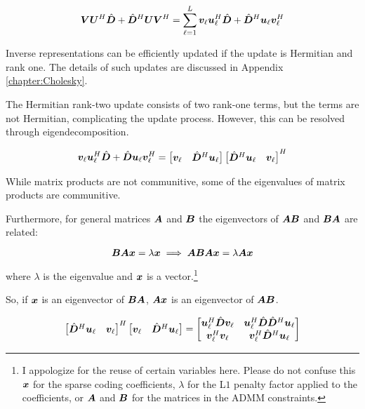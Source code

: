 \begin{equation}
\bm{V}\bm{U}^H\hat{\bm{D}} + \hat{\bm{D}}^H\bm{U}\bm{V}^H = \sum_{\ell = 1}^{L} \bm{v}_{\ell}\bm{u}_{\ell}^H\hat{\bm{D}} + \hat{\bm{D}}^H\bm{u}_{\ell}\bm{v}_{\ell}^H
\end{equation}


Inverse representations can be efficiently updated if the update is Hermitian and rank one. The details of such updates are discussed in Appendix \ref{chapter:Cholesky}.

The Hermitian rank-two update consists of two rank-one terms, but the terms are not Hermitian, complicating the update process. However, this can be resolved through eigendecomposition.  

\begin{equation}
\bm{v}_{\ell}\bm{u}_{\ell}^H \hat{\bm{D}} + \hat{\bm{D}}\bm{u}_{\ell}\bm{v}_{\ell}^H = \begin{bmatrix}
\bm{v}_{\ell} & \hat{\bm{D}}^H\bm{u}_{\ell} 
\end{bmatrix}
\begin{bmatrix}
\hat{\bm{D}}^H\bm{u}_{\ell} & \bm{v}_{\ell}
\end{bmatrix}^H
\end{equation}

While matrix products are not communitive, some of the eigenvalues of matrix products are communitive.

Furthermore, for general matrices $\bm{A}$ and $\bm{B}$ the eigenvectors of $\bm{A}\bm{B}$ and $\bm{B}\bm{A}$ are related:

\begin{equation}
\bm{B}\bm{A}\bm{x} = \lambda\bm{x}  \implies  \bm{A}\bm{B}\bm{A}\bm{x} = \lambda\bm{A}\bm{x}
\end{equation}

where $\lambda$ is the eigenvalue and $\bm{x}$ is a vector.\footnote{I appologize for the reuse of certain variables here. Please do not confuse this $\bm{x}$ for the sparse coding coefficients, $\lambda$ for the L$1$ penalty factor applied to the coefficients, or $\bm{A}$ and $\bm{B}$ for the matrices in the ADMM constraints.}

So, if $\bm{x}$ is an eigenvector of $\bm{B}\bm{A}$, $\bm{A}\bm{x}$ is an eigenvector of $\bm{A}\bm{B}$.


\begin{equation}
\begin{bmatrix}
\hat{\bm{D}}^H\bm{u}_{\ell} & \bm{v}_{\ell}
\end{bmatrix}^H
\begin{bmatrix}
\bm{v}_{\ell} & \hat{\bm{D}}^H\bm{u}_{\ell} 
\end{bmatrix}
 = 
\begin{bmatrix}
\bm{u}_{\ell}^H\hat{\bm{D}}\bm{v}_{\ell} & \bm{u}_{\ell}^H\hat{\bm{D}}\hat{\bm{D}}^H\bm{u}_{\ell} \\
\bm{v}_{\ell}^H\bm{v}_{\ell}    & \bm{v}_{\ell}^H\hat{\bm{D}}^H\bm{u}_{\ell}
\end{bmatrix}
\end{equation}

